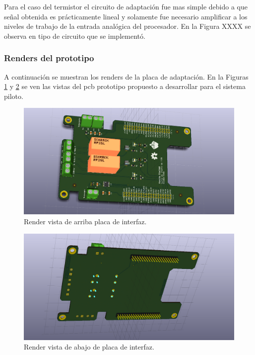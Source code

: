Para el caso del termistor el circuito de adaptación fue mas simple debido a que señal obtenida es prácticamente lineal y solamente fue necesario amplificar a los niveles de trabajo de la entrada analógica del procesador. En la Figura XXXX se observa en tipo de circuito que se implementó.


\subsubsection{Renders del prototipo}

A continuación se muestran los renders de la placa de adaptación. En la Figuras \ref{fig:renderPonchoTOP} y \ref{fig:renderPonchoBOT} se ven las vistas del pcb prototipo propuesto a desarrollar para el sistema piloto. 

\begin{figure}[h!]
	\centering
	\includegraphics[width=.9\textwidth]{Figures/tempRelayPoncho_TOP}
	\caption{Render vista de arriba placa de interfaz.}
	\label{fig:renderPonchoTOP}
\end{figure}

\begin{figure}[h!]
	\centering
	\includegraphics[width=.9\textwidth]{Figures/tempRelayPoncho_BOTTOM}
	\caption{Render vista de abajo de placa de interfaz.}
	\label{fig:renderPonchoBOT}
\end{figure}


